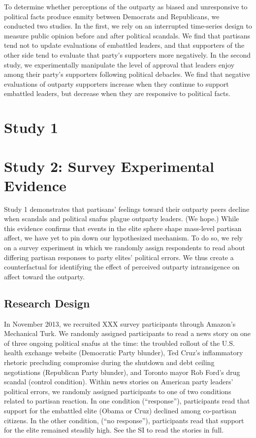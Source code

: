 \documentclass[12pt]{article}
\begin{document}
To determine whether perceptions of the outparty as biased and unresponsive to political facts produce enmity between Democrats and Republicans, we conducted two studies. In the first, we rely on an interrupted time-series design to measure public opinion before and after political scandals. We find that partisans tend not to update evaluations of embattled leaders, and that supporters of the other side tend to evaluate that party's supporters more negatively. In the second study, we experimentally manipulate the level of approval that leaders enjoy among their party's supporters following political debacles. We find that negative evaluations of outparty supporters increase when they continue to support embattled leaders, but decrease when they are responsive to political facts. 

\section*{Study 1}

\section*{Study 2: Survey Experimental Evidence}
Study 1 demonstrates that partisans' feelings toward their outparty peers decline when scandals and political snafus plague outparty leaders. (We hope.) While this evidence confirms that events in the elite sphere shape mass-level partisan affect, we have yet to pin down our hypothesized mechanism. To do so, we rely on a survey experiment in which we randomly assign respondents to read about differing partisan responses to party elites' political errors. We thus create a counterfactual for identifying the effect of perceived outparty intransigence on affect toward the outparty.

\subsection*{Research Design}
In November 2013, we recruited XXX survey participants through Amazon's Mechanical Turk. We randomly assigned participants to read a news story on one of three ongoing political snafus at the time: the troubled rollout of the U.S. health exchange website (Democratic Party blunder), Ted Cruz's inflammatory rhetoric precluding compromise during the shutdown and debt ceiling negotiations (Republican Party blunder), and Toronto mayor Rob Ford's drug scandal (control condition). Within news stories on American party leaders' political errors, we randomly assigned participants to one of two conditions related to partisan reaction. In one condition (``response''), participants read that support for the embattled elite (Obama or Cruz) declined among co-partisan citizens. In the other condition, (``no response''), participants read that support for the elite remained steadily high. See the SI to read the stories in full.
\end{document}
